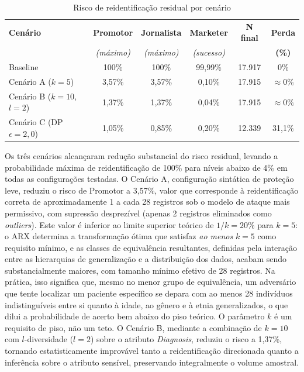 \begin{table}[ht]
\centering
\caption{Risco de reidentificação residual por cenário}
\label{tab:risco-reid}
\small
\setlength{\tabcolsep}{4pt}
\begin{tabular}{l|c|c|c|c|c}
\hline
\textbf{Cenário} & \textbf{Promotor} & \textbf{Jornalista} & \textbf{Marketer} & \textbf{N final} & \textbf{Perda} \\
 & \textit{(máximo)} & \textit{(máximo)} & \textit{(sucesso)} & & \textbf{(\%)} \\ \hline
Baseline & 100\% & 100\% & 99,99\% & 17.917 & 0\% \\
Cenário A ($k=5$) & 3,57\% & 3,57\% & 0,10\% & 17.915 & $\approx 0\%$ \\
Cenário B ($k=10$, $l=2$) & 1,37\% & 1,37\% & 0,04\% & 17.915 & $\approx 0\%$ \\
Cenário C (DP $\epsilon=2{,}0$) & 1,05\% & 0,85\% & 0,20\% & 12.339 & 31,1\% \\ \hline
\end{tabular}
\end{table}

Os três cenários alcançaram redução substancial do risco residual, levando a probabilidade máxima de reidentificação de 100\% para níveis abaixo de 4\% em todas as configurações testadas. O Cenário A, configuração sintática de proteção leve, reduziu o risco de Promotor a 3,57\%, valor que corresponde à reidentificação correta de aproximadamente 1 a cada 28 registros sob o modelo de ataque mais permissivo, com supressão desprezível (apenas 2 registros eliminados como \textit{outliers}). Este valor é inferior ao limite superior teórico de $1/k = 20\%$ para $k=5$: o ARX determina a transformação ótima que satisfaz \textit{ao menos} $k=5$ como requisito mínimo, e as classes de equivalência resultantes, definidas pela interação entre as hierarquias de generalização e a distribuição dos dados, acabam sendo substancialmente maiores, com tamanho mínimo efetivo de 28 registros. Na prática, isso significa que, mesmo no menor grupo de equivalência, um adversário que tente localizar um paciente específico se depara com ao menos 28 indivíduos indistinguíveis entre si quanto à idade, ao gênero e à etnia generalizados, o que dilui a probabilidade de acerto bem abaixo do piso teórico. O parâmetro $k$ é um requisito de piso, não um teto. O Cenário B, mediante a combinação de $k=10$ com $l$-diversidade ($l=2$) sobre o atributo \textit{Diagnosis}, reduziu o risco a 1,37\%, tornando estatisticamente improvável tanto a reidentificação direcionada quanto a inferência sobre o atributo sensível, preservando integralmente o volume amostral.


